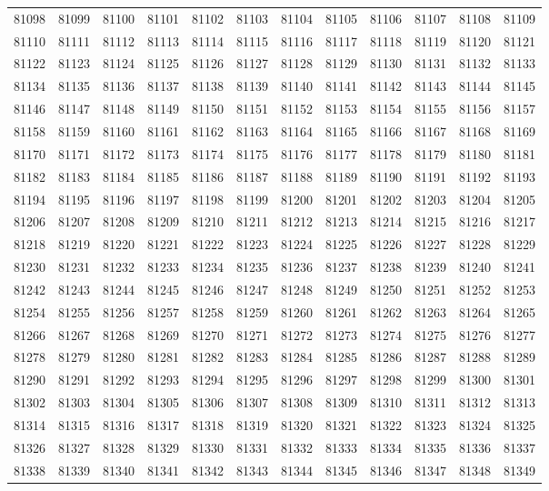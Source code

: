 \begin{center}
\begin{longtable}{llllllllllll}
81098 &81099 &81100 &81101 &81102 &81103 &81104 &81105 &81106 &81107 &81108 &81109 \\
81110 &81111 &81112 &81113 &81114 &81115 &81116 &81117 &81118 &81119 &81120 &81121 \\
81122 &81123 &81124 &81125 &81126 &81127 &81128 &81129 &81130 &81131 &81132 &81133 \\
81134 &81135 &81136 &81137 &81138 &81139 &81140 &81141 &81142 &81143 &81144 &81145 \\
81146 &81147 &81148 &81149 &81150 &81151 &81152 &81153 &81154 &81155 &81156 &81157 \\
81158 &81159 &81160 &81161 &81162 &81163 &81164 &81165 &81166 &81167 &81168 &81169 \\
81170 &81171 &81172 &81173 &81174 &81175 &81176 &81177 &81178 &81179 &81180 &81181 \\
81182 &81183 &81184 &81185 &81186 &81187 &81188 &81189 &81190 &81191 &81192 &81193 \\
81194 &81195 &81196 &81197 &81198 &81199 &81200 &81201 &81202 &81203 &81204 &81205 \\
81206 &81207 &81208 &81209 &81210 &81211 &81212 &81213 &81214 &81215 &81216 &81217 \\
81218 &81219 &81220 &81221 &81222 &81223 &81224 &81225 &81226 &81227 &81228 &81229 \\
81230 &81231 &81232 &81233 &81234 &81235 &81236 &81237 &81238 &81239 &81240 &81241 \\
81242 &81243 &81244 &81245 &81246 &81247 &81248 &81249 &81250 &81251 &81252 &81253 \\
81254 &81255 &81256 &81257 &81258 &81259 &81260 &81261 &81262 &81263 &81264 &81265 \\
81266 &81267 &81268 &81269 &81270 &81271 &81272 &81273 &81274 &81275 &81276 &81277 \\
81278 &81279 &81280 &81281 &81282 &81283 &81284 &81285 &81286 &81287 &81288 &81289 \\
81290 &81291 &81292 &81293 &81294 &81295 &81296 &81297 &81298 &81299 &81300 &81301 \\
81302 &81303 &81304 &81305 &81306 &81307 &81308 &81309 &81310 &81311 &81312 &81313 \\
81314 &81315 &81316 &81317 &81318 &81319 &81320 &81321 &81322 &81323 &81324 &81325 \\
81326 &81327 &81328 &81329 &81330 &81331 &81332 &81333 &81334 &81335 &81336 &81337 \\
81338 &81339 &81340 &81341 &81342 &81343 &81344 &81345 &81346 &81347 &81348 &81349 \\

\end{longtable}
\end{center}
